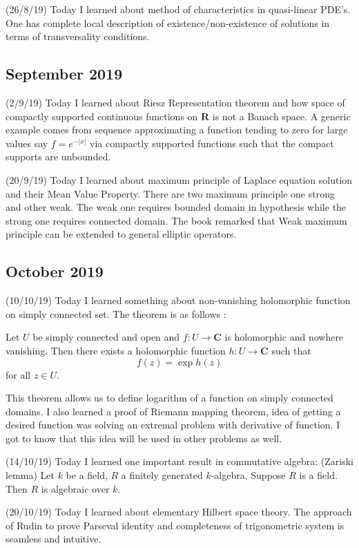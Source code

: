\documentclass[12pt,a4paper]{article}
\begin{document}
(26/8/19) Today I learned about method of characteristics in quasi-linear PDE's. One has complete local description of existence/non-existence of  solutions in terms of transversality conditions. 

\subsection*{September 2019} 

\quad (2/9/19) Today I learned about Riesz Representation theorem and how space of compactly supported continuous functions on $\mathbf{R}$ is not a Banach space. A generic example comes from sequence approximating a function tending to zero for large values say $f=e^{-|x|}$ via compactly supported functions such that the compact supports are unbounded.

(20/9/19) Today I learned about maximum principle of Laplace equation solution and their Mean Value Property. There are two maximum principle one strong and other weak. The weak one requires bounded domain in hypothesis while the strong one requires connected domain. The book remarked that Weak maximum principle can be extended to general elliptic operators.

\subsection*{October 2019}

\quad (10/10/19) Today I learned something about non-vanishing holomorphic function on simply connected set. The theorem is as follows :

Let $U$ be simply connected and open and $f : U \rightarrow \mathbf{C}$ is holomorphic and nowhere vanishing. Then there exists a holomorphic function $h: U \rightarrow \mathbf{C}$ such that $$f(z)=\exp{h(z)}$$
for all $z\in U$.

This theorem allows us to define logarithm of a function on simply connected domains.
I also learned a proof of Riemann mapping theorem, idea of getting a desired function was solving an extremal problem with derivative of function. I got to know that this idea will be used in other problems as well.

(14/10/19) Today I learned one important result in commutative algebra:
(Zariski lemma) Let $k$ be a field, $R$ a finitely generated $k$-algebra. Suppose $R$ is a field. Then $R$ is algebraic over $k$.

(20/10/19) Today I learned about elementary Hilbert space theory. The approach of Rudin to prove Parseval identity and completeness of trigonometric system is seamless and intuitive. 
\end{document}
